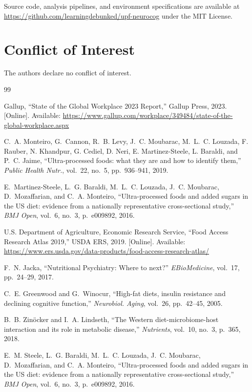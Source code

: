 \documentclass[journal]{IEEEtran}
\begin{document}
Source code, analysis pipelines, and environment specifications are available at
\url{https://github.com/learningdebunked/upf-neurocog} under the MIT License.

\section*{Conflict of Interest}

The authors declare no conflict of interest.


\begin{thebibliography}{99}

Gallup, ``State of the Global Workplace 2023 Report,''
Gallup Press, 2023. [Online]. Available:
\url{https://www.gallup.com/workplace/349484/state-of-the-global-workplace.aspx}

C.~A. Monteiro, G.~Cannon, R.~B. Levy, J.~C. Moubarac, M.~L.~C. Louzada,
F. Rauber, N. Khandpur, G. Cediel, D. Neri, E. Martinez-Steele, L. Baraldi, and
P.~C. Jaime, ``Ultra-processed foods: what they are and how to identify them,''
\textit{Public Health Nutr.}, vol.~22, no.~5, pp.~936--941, 2019.

E.~Martinez-Steele, L.~G. Baraldi, M.~L.~C. Louzada, J.~C. Moubarac, D.~Mozaffarian,
and C.~A. Monteiro, ``Ultra-processed foods and added sugars in the US diet:
evidence from a nationally representative cross-sectional study,''
\textit{BMJ Open}, vol.~6, no.~3, p.~e009892, 2016.

U.S. Department of Agriculture, Economic Research Service,
``Food Access Research Atlas 2019,'' USDA ERS, 2019.
[Online]. Available: \url{https://www.ers.usda.gov/data-products/food-access-research-atlas/}

F.~N. Jacka, ``Nutritional Psychiatry: Where to next?''
\textit{EBioMedicine}, vol.~17, pp.~24--29, 2017.

C.~E. Greenwood and G.~Winocur, ``High-fat diets, insulin resistance and
declining cognitive function,'' \textit{Neurobiol. Aging}, vol.~26, pp.~42--45, 2005.

B.~B. Zinöcker and I.~A. Lindseth, ``The Western diet-microbiome-host interaction
and its role in metabolic disease,'' \textit{Nutrients}, vol.~10, no.~3, p.~365, 2018.

E.~M. Steele, L.~G. Baraldi, M.~L.~C. Louzada, J.~C. Moubarac, D.~Mozaffarian, and
C.~A. Monteiro, ``Ultra-processed foods and added sugars in the US diet: evidence
from a nationally representative cross-sectional study,''
\textit{BMJ Open}, vol.~6, no.~3, p.~e009892, 2016.


\end{thebibliography}
\end{document}
